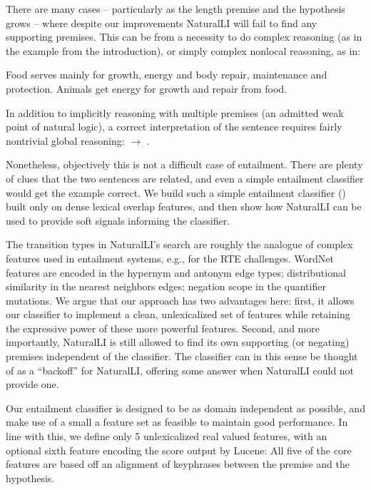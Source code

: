 There are many cases -- particularly as the length premise and the hypothesis grows --
  where despite our improvements NaturalLI will fail to find any supporting
  premises.
This can be from a necessity to do complex reasoning (as in the example from the 
  introduction), or simply complex nonlocal reasoning, as in:

\entailmentExample
{Food serves mainly for growth, energy and body repair, maintenance and protection.}
{Animals get energy for growth and repair from food.}

In addition to implicitly reasoning with multiple premises (an admitted weak
  point of natural logic), a correct interpretation of the sentence requires
  fairly nontrivial global reasoning: 
  $\rightarrow$ .

Nonetheless, objectively this is not a difficult case of entailment.
There are plenty of clues that the two sentences are related, and even a simple
  entailment classifier would get the example correct.
We build such a simple entailment classifier () built only
  on dense lexical overlap features, and
  then show how NaturalLI can be used to provide soft signals informing the classifier.

The transition types in NaturalLI's search are roughly the analogue of complex features
  used in entailment systems, e.g., for the RTE challenges.
WordNet features are encoded in the hypernym and antonym edge types; distributional
  similarity in the nearest neighbors edges; negation scope in the quantifier
  mutations.
We argue that our approach has two advantages here: 
  first, it allows our classifier to implement a clean, unlexicalized set of
  features while retaining the expressive power of these more powerful features.
Second, and more importantly, NaturalLI is still allowed to find its own supporting
  (or negating) premises independent of the classifier.
The classifier can in this sense be thought of as a ``backoff'' for NaturalLI,
  offering some answer when NaturalLI could not provide one.


%
%
Our entailment classifier is designed to be as domain independent as possible,
  and make use of a small a feature set as feasible to maintain good performance.
In line with this, we define only 5 unlexicalized real valued features, with an 
  optional sixth feature encoding the score output by Lucene:
All five of the core features are based off an alignment of keyphrases between the
  premise and the hypothesis.

